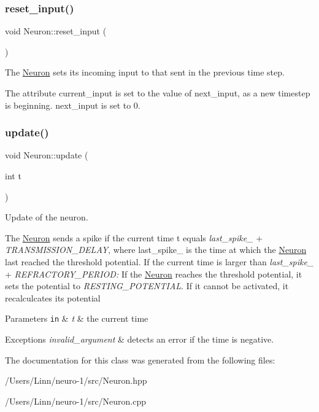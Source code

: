 \subsubsection{\texorpdfstring{reset\+\_\+input()}{reset\_input()}}
{\footnotesize\ttfamily void Neuron\+::reset\+\_\+input (\begin{DoxyParamCaption}{ }\end{DoxyParamCaption})}



The \hyperlink{class_neuron}{Neuron} sets its incoming input to that sent in the previous time step. 

The attribute current\+\_\+input is set to the value of next\+\_\+input, as a new timestep is beginning. next\+\_\+input is set to 0. \hypertarget{class_neuron_afa48309ba910b2528c036ceaae310e07}{}\label{class_neuron_afa48309ba910b2528c036ceaae310e07} 
\subsubsection{\texorpdfstring{update()}{update()}}
{\footnotesize\ttfamily void Neuron\+::update (\begin{DoxyParamCaption}\item[{int}]{t }\end{DoxyParamCaption})}



Update of the neuron. 

The \hyperlink{class_neuron}{Neuron} sends a spike if the current time t equals {\itshape last\+\_\+spike\+\_\+} + {\itshape T\+R\+A\+N\+S\+M\+I\+S\+S\+I\+O\+N\+\_\+\+D\+E\+L\+AY}, where last\+\_\+spike\+\_\+ is the time at which the \hyperlink{class_neuron}{Neuron} last reached the threshold potential. If the current time is larger than {\itshape last\+\_\+spike\+\_\+} + {\itshape R\+E\+F\+R\+A\+C\+T\+O\+R\+Y\+\_\+\+P\+E\+R\+I\+OD\+:} If the \hyperlink{class_neuron}{Neuron} reaches the threshold potential, it sets the potential to {\itshape R\+E\+S\+T\+I\+N\+G\+\_\+\+P\+O\+T\+E\+N\+T\+I\+AL}. If it cannot be activated, it recalculcates its potential 
\begin{DoxyParams}[1]{Parameters}
\mbox{\tt in}  & {\em t} & the current time \\
\hline
\end{DoxyParams}

\begin{DoxyExceptions}{Exceptions}
{\em invalid\+\_\+argument} & detects an error if the time is negative. \\
\hline
\end{DoxyExceptions}


The documentation for this class was generated from the following files\+:\begin{DoxyCompactItemize}
\item 
/\+Users/\+Linn/neuro-\/1/src/Neuron.\+hpp\item 
/\+Users/\+Linn/neuro-\/1/src/Neuron.\+cpp\end{DoxyCompactItemize}
